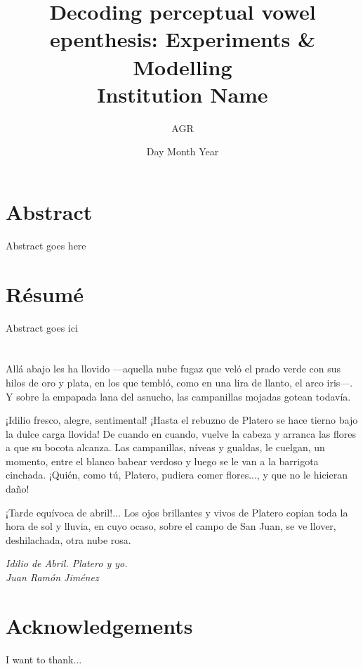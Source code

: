 \documentclass[12pt, twoside]{report}
\title{
	{Decoding perceptual vowel epenthesis: Experiments \& Modelling}\\
	{\large Institution Name}\\
}
\author{AGR}
\date{Day Month Year}
\begin{document}
\maketitle

\chapter*{Abstract}
Abstract goes here

\chapter*{Résumé}
Abstract goes ici

\chapter*{}
\epigraph{%
  Allá abajo les ha llovido —aquella nube fugaz que veló el prado verde con sus hilos de oro y plata, en los que tembló, como en una lira de llanto, el arco iris—. Y sobre la empapada lana del asnucho, las campanillas mojadas gotean todavía.

  ¡Idilio fresco, alegre, sentimental! ¡Hasta el rebuzno de Platero se hace tierno bajo la dulce carga llovida! De cuando en cuando, vuelve la cabeza y arranca las flores a que su bocota alcanza. Las campanillas, níveas y gualdas, le cuelgan, un momento, entre el blanco babear verdoso y luego se le van a la barrigota cinchada. ¡Quién, como tú, Platero, pudiera comer flores..., y que no le hicieran daño!

    ¡Tarde equívoca de abril!... Los ojos brillantes y vivos de Platero copian toda la hora de sol y lluvia, en cuyo ocaso, sobre el campo de San Juan, se ve llover, deshilachada, otra nube rosa.}{\textit{Idilio de Abril. Platero y yo. \\ Juan Ramón Jiménez}}


\chapter*{Acknowledgements}
I want to thank...
\end{document}
